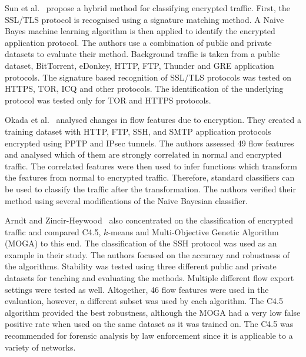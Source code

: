 Sun et al.~\cite{Sun-2010-Novel} propose a hybrid method for classifying encrypted traffic. First, the SSL/TLS protocol is recognised using a signature matching method. A Naive Bayes machine learning algorithm is then applied to identify the encrypted application protocol. The authors use a combination of public and private datasets to evaluate their method. Background traffic is taken from a public dataset, BitTorrent, eDonkey, HTTP, FTP, Thunder and GRE application protocols. The signature based recognition of SSL/TLS protocols was tested on HTTPS, TOR, ICQ and other protocols. The identification of the underlying protocol was tested only for TOR and HTTPS protocols.

Okada et al.~\cite{Okada-2011-Application} analysed changes in flow features due to encryption. They created a training dataset with HTTP, FTP, SSH, and SMTP application protocols encrypted using PPTP and IPsec tunnels. The authors assessed 49 flow features and analysed which of them are strongly correlated in normal and encrypted traffic. The correlated features were then used to infer functions which transform the features from normal to encrypted traffic. Therefore, standard classifiers can be used to classify the traffic after the transformation. The authors verified their method using several modifications of the Naive Bayesian classifier.

Arndt and Zincir-Heywood~\cite{Arndt-2011-Comparison} also concentrated on the classification of encrypted traffic and compared C4.5, $k$-means and Multi-Objective Genetic Algorithm (MOGA) to this end. The classification of the SSH protocol was used as an example in their study. The authors focused on the accuracy and robustness of the algorithms. Stability was tested using three different public and private datasets for teaching and evaluating the methods. Multiple different flow export settings were tested as well. Altogether, 46 flow features were used in the evaluation, however, a different subset was used by each algorithm. The C4.5 algorithm provided the best robustness, although the MOGA had a very low false positive rate when used on the same dataset as it was trained on. The C4.5 was recommended for forensic analysis by law enforcement since it is applicable to a variety of networks.

